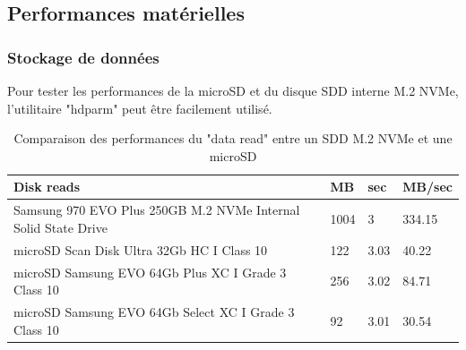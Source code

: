 ﻿\subsection{Performances matérielles}
\subsubsection{Stockage de données}
\par Pour tester les performances de la microSD et du disque SDD interne M.2 NVMe, l'utilitaire "hdparm" peut être facilement utilisé. 
{
   \vspace{0.1em} %
   \renewcommand*{\arraystretch}{1.4}
   \begin{longtable}[t]{@{}|p{28em}|p{2em}|p{2em}|p{3em}|@{}} 
      \caption{Comparaison des performances du "data read" entre un SDD M.2 NVMe et une microSD}\label{tab:Timing O_DIRECT disk reads}\\
      \hline
      \textbf{Disk reads} & \textbf{MB} & \textbf{sec} & \textbf{MB/sec}\\
      \hline
      Samsung 970 EVO Plus 250GB M.2 NVMe Internal Solid State Drive & 1004 & 3 & 334.15\\
      \hline
      microSD Scan Disk Ultra 32Gb HC I Class 10 & 122 & 3.03 & 40.22\\
      \hline
      microSD Samsung EVO 64Gb Plus XC I Grade 3 Class 10 & 256 & 3.02 & 84.71\\
      \hline
      microSD Samsung EVO 64Gb Select XC I Grade 3 Class 10 & 92 & 3.01 & 30.54\\
      \hline
   \end{longtable}
}
